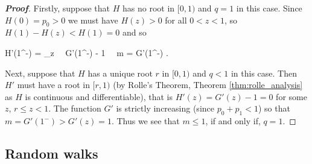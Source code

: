 \begin{proof}[\bf Proof]

Firstly, suppose that $H$ has no root in $[0, 1)$ and $q=1$ in this case. Since $H(0) = p_0 > 0$ we must have $H(z) > 0$ for all $0 < z < 1$, so $H(1) - H(z) < H(1) = 0$ and so

\be H'(1^-) = \lim_{z}   \ \ra \ G'(1^-) - 1 \ \ra\  m = G'(1^-) . \ee

Next, suppose that $H$ has a unique root $r$ in $[0, 1)$ and $q<1$ in this case. Then $H'$ must have a root in $[r, 1)$ (by Rolle's Theorem, Theorem \ref{thm:rolle_analysis} as $H$ is continuous and differentiable), that is
$H'(z) = G'(z)-1 = 0$ for some $z$, $r \leq z < 1$. The function $G'$ is strictly increasing (since $p_0 + p_1 < 1$) so that $m = G'(1^-) > G'(z) = 1$. Thus we see that $m \leq 1$, if and only if, $q = 1$.
\end{proof}


\subsection{Random walks}

